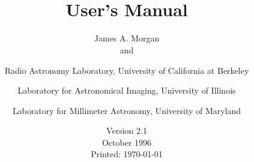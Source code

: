%
%
\makeindex
%
\title{\wip\\ User's Manual}
%
\author{James A. Morgan\\
        and \\
   \and
        Radio Astronomy Laboratory, University of California at Berkeley \\
   \and
        Laboratory for Astronomical Imaging, University of Illinois \\
   \and
        Laboratory for Millimeter Astronomy, University of Maryland
}
%
\date{Version 2.1 \\
   October 1996 \\
   Printed: \today
}
%
%
\setlength{\parindent}{0pt}
\setlength{\parskip}{2.5mm}
%
\addtolength{\textwidth}{1.5in}
\addtolength{\evensidemargin}{-0.75in}
\addtolength{\oddsidemargin}{-0.75in}
%
%
%
\newcommand{\insertplot}[5]{
  \section{#1}
  \small
  \fileverbatim{Examples/#2.wip}
  \normalsize
  \subsection*{#4}
  \footnotesize
  \fileverbatim{#5}
  \normalsize
  \begin{figure}[p]
    \wipplot{#2}
    \caption{#3}
    \mylabel{p:#2}
  \end{figure}
}


